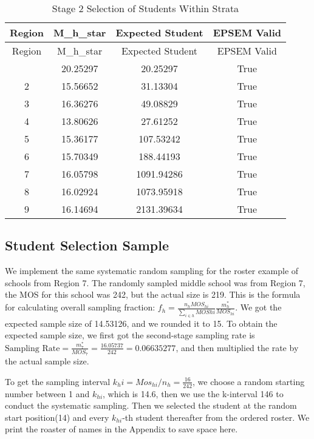 \documentclass[
  12pt]{article}
\begin{document}
\begin{longtable}[]{@{}cccc@{}}
\caption{Stage 2 Selection of Students Within Strata}\tabularnewline
\toprule\noalign{}
Region & M\_h\_star & Expected Student & EPSEM Valid \\
\midrule\noalign{}
\endfirsthead
\toprule\noalign{}
Region & M\_h\_star & Expected Student & EPSEM Valid \\
\midrule\noalign{}
\endhead
\bottomrule\noalign{}
\endlastfoot
1 & 20.25297 & 20.25297 & True \\
2 & 15.56652 & 31.13304 & True \\
3 & 16.36276 & 49.08829 & True \\
4 & 13.80626 & 27.61252 & True \\
5 & 15.36177 & 107.53242 & True \\
6 & 15.70349 & 188.44193 & True \\
7 & 16.05798 & 1091.94286 & True \\
8 & 16.02924 & 1073.95918 & True \\
9 & 16.14694 & 2131.39634 & True \\
\end{longtable}

\subsection{Student Selection Sample}\label{student-selection-sample}

We implement the same systematic random sampling for the roster example
of schools from Region 7. The randomly sampled middle school was from
Region 7, the MOS for this school was 242, but the actual size is 219.
This is the formula for calculating overall sampling fraction:
\(f_h = \frac{n_h MOS_{hi} }{\sum_{i \in h} MOS{hi} } \frac{m^*_h}{MOS_{hi}}\).
We got the expected sample size of 14.53126, and we rounded it to 15. To
obtain the expected sample size, we first got the second-stage sampling
rate is
\(\text{Sampling Rate} = \frac{m^*_{7}}{MOS_7} = \frac{16.05737}{242} = 0.06635277\),
and then multiplied the rate by the actual sample size.

To get the sampling interval \(k_hi = Mos_{hi} / n_h = \frac{16}{242}\),
we choose a random starting number between 1 and \(k_{hi}\), which is
14.6, then we use the k-interval 146 to conduct the systematic sampling.
Then we selected the student at the random start position(14) and every
\(k_{hi}\)-th student thereafter from the ordered roster. We print the
roaster of names in the Appendix to save space here.
\end{document}
